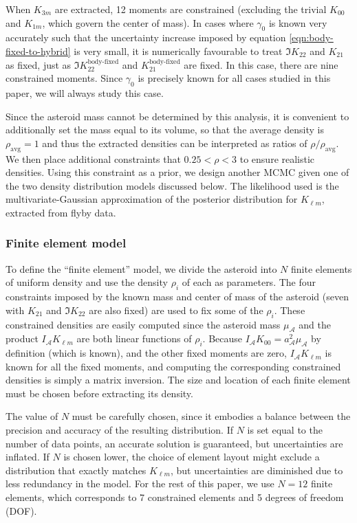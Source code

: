 \documentclass[fleqn,usenatbib]{mnras}
\begin{document}
When $K_{3m}$ are extracted, 12 moments are constrained (excluding the trivial $K_{00}$ and $K_{1m}$, which govern the center of mass). In cases where $\gamma_0$ is known very accurately such that the uncertainty increase imposed by equation \ref{eqn:body-fixed-to-hybrid} is very small, it is numerically favourable to treat $\Im K_{22}$ and $K_{21}$ as fixed, just as $\Im K_{22}^\text{body-fixed}$ and $K_{21}^\text{body-fixed}$ are fixed. In this case, there are nine constrained moments. Since $\gamma_0$ is precisely known for all cases studied in this paper, we will always study this case.

Since the asteroid mass cannot be determined by this analysis, it is convenient to additionally set the mass equal to its volume, so that the average density is $\rho_\text{avg}=1$ and thus the extracted densities can be interpreted as ratios of $\rho / \rho_\text{avg}$. We then place additional constraints that $0.25 < \rho < 3$ to ensure realistic densities. Using this constraint as a prior, we design another MCMC given one of the two density distribution models discussed below. The likelihood used is the multivariate-Gaussian approximation of the posterior distribution for $K_{\ell m}$, extracted from flyby data.


\subsubsection{Finite element model}

To define the ``finite element'' model, we divide the asteroid into $N$ finite elements of uniform density and use the density $\rho_i$ of each as parameters. The four constraints imposed by the known mass and center of mass of the asteroid (seven with $K_{21}$ and $\Im K_{22}$ are also fixed) are used to fix some of the $\rho_i$. These constrained densities are easily computed since the asteroid mass $\mu_\mathcal{A}$ and the product $I_\mathcal{A}K_{\ell m}$ are both linear functions of $\rho_i$. Because $I_\mathcal{A}K_{00} = a_\mathcal{A}^2\mu_\mathcal{A}$ by definition (which is known), and the other fixed moments are zero, $I_\mathcal{A} K_{\ell m}$ is known for all the fixed moments, and computing the corresponding constrained densities is simply a matrix inversion. The size and location of each finite element must be chosen before extracting its density.

The value of $N$ must be carefully chosen, since it embodies a balance between the precision and accuracy of the resulting distribution. If $N$ is set equal to the number of data points, an accurate solution is guaranteed, but uncertainties are inflated. If $N$ is chosen lower, the choice of element layout might exclude a distribution that exactly matches $K_{\ell m}$, but uncertainties are diminished due to less redundancy in the model. For the rest of this paper, we use $N=12$ finite elements, which corresponds to 7 constrained elements and 5 degrees of freedom (DOF).
\end{document}
